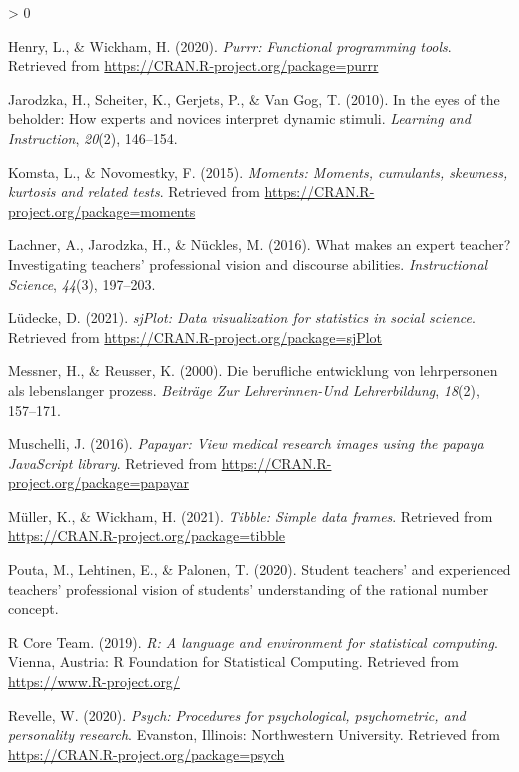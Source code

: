 \documentclass[
  english,
  man,floatsintext]{apa6}
\newlength{\cslhangindent}
\newenvironment{CSLReferences}[2] %
 {%
  \setlength{\parindent}{0pt}
  \ifodd #1 \everypar{\setlength{\hangindent}{\cslhangindent}}\ignorespaces\fi
  \ifnum #2 > 0
  \setlength{\parskip}{#2\baselineskip}
  \fi
 }%
 {}
\begin{document}
\begin{CSLReferences}{1}{0}
\leavevmode\hypertarget{ref-R-purrr}{}%
Henry, L., \& Wickham, H. (2020). \emph{Purrr: Functional programming tools}. Retrieved from \url{https://CRAN.R-project.org/package=purrr}

\leavevmode\hypertarget{ref-jarodzka2010eyes}{}%
Jarodzka, H., Scheiter, K., Gerjets, P., \& Van Gog, T. (2010). In the eyes of the beholder: How experts and novices interpret dynamic stimuli. \emph{Learning and Instruction}, \emph{20}(2), 146--154.

\leavevmode\hypertarget{ref-R-moments}{}%
Komsta, L., \& Novomestky, F. (2015). \emph{Moments: Moments, cumulants, skewness, kurtosis and related tests}. Retrieved from \url{https://CRAN.R-project.org/package=moments}

\leavevmode\hypertarget{ref-lachner2016makes}{}%
Lachner, A., Jarodzka, H., \& Nückles, M. (2016). What makes an expert teacher? Investigating teachers' professional vision and discourse abilities. \emph{Instructional Science}, \emph{44}(3), 197--203.

\leavevmode\hypertarget{ref-R-sjPlot}{}%
Lüdecke, D. (2021). \emph{sjPlot: Data visualization for statistics in social science}. Retrieved from \url{https://CRAN.R-project.org/package=sjPlot}

\leavevmode\hypertarget{ref-messner2000berufliche}{}%
Messner, H., \& Reusser, K. (2000). Die berufliche entwicklung von lehrpersonen als lebenslanger prozess. \emph{Beitr{ä}ge Zur Lehrerinnen-Und Lehrerbildung}, \emph{18}(2), 157--171.

\leavevmode\hypertarget{ref-R-papayar}{}%
Muschelli, J. (2016). \emph{Papayar: View medical research images using the papaya JavaScript library}. Retrieved from \url{https://CRAN.R-project.org/package=papayar}

\leavevmode\hypertarget{ref-R-tibble}{}%
Müller, K., \& Wickham, H. (2021). \emph{Tibble: Simple data frames}. Retrieved from \url{https://CRAN.R-project.org/package=tibble}

\leavevmode\hypertarget{ref-pouta2020student}{}%
Pouta, M., Lehtinen, E., \& Palonen, T. (2020). Student teachers' and experienced teachers' professional vision of students' understanding of the rational number concept.

\leavevmode\hypertarget{ref-R-base}{}%
R Core Team. (2019). \emph{R: A language and environment for statistical computing}. Vienna, Austria: R Foundation for Statistical Computing. Retrieved from \url{https://www.R-project.org/}

\leavevmode\hypertarget{ref-R-psych}{}%
Revelle, W. (2020). \emph{Psych: Procedures for psychological, psychometric, and personality research}. Evanston, Illinois: Northwestern University. Retrieved from \url{https://CRAN.R-project.org/package=psych}


\end{CSLReferences}
\end{document}
